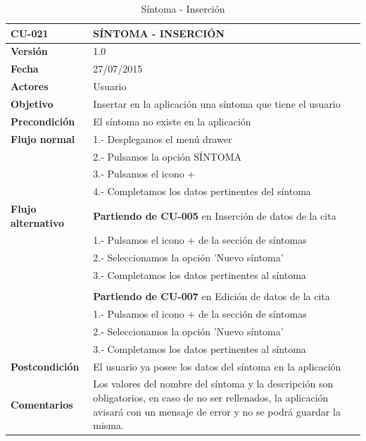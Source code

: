 \documentclass[../pfc.tex]{subfiles}
\begin{document}
	\begin{table}[H]
		\centering
		\begin{tabular}[t]{|p{3cm}|p{9.5cm}|}
			\hline \textbf{CU-021} & \textbf{SÍNTOMA - INSERCIÓN} \\*
			\hline\hline \textbf{Versión} & 1.0 \\*
			\hline\hline \textbf{Fecha} & 27/07/2015 \\*
			\hline\textbf{Actores} 	& Usuario\\*
			\hline \textbf{Objetivo} & Insertar en la aplicación una síntoma que tiene el usuario\\* 			
			\hline \textbf{Precondición} & El síntoma no existe en la aplicación\\* 
			\hline \textbf{Flujo normal} & 1.- Desplegamos el menú drawer \\* 
			& 2.- Pulsamos la opción SÍNTOMA\\*	
			& 3.- Pulsamos el icono +\\*	
			& 4.- Completamos los datos pertinentes del síntoma\\*	
			\hline \textbf{Flujo alternativo} & \textbf{Partiendo de CU-005} en Inserción de datos de la cita\\* 
			& 1.- Pulsamos el icono + de la sección de síntomas\\*	
			& 2.- Seleccionamos la opción 'Nuevo síntoma'\\*
			& 3.- Completamos los datos pertinentes al síntoma\\*
			& \\*
			& \textbf{Partiendo de CU-007} en Edición de datos de la cita\\* 
			& 1.- Pulsamos el icono + de la sección de síntomas\\*	
			& 2.- Seleccionamos la opción 'Nuevo síntoma'\\*
			& 3.- Completamos los datos pertinentes al síntoma\\*
			\hline \textbf{Postcondición} & El usuario ya posee los datos del síntoma en la aplicación \\* 
			\hline \textbf{Comentarios}   & Los valores del nombre del síntoma y la descripción son obligatorios, en caso de no ser rellenados, la aplicación avisará con un mensaje de error y no se podrá guardar la misma.\\*
			\hline
		\end{tabular}
		\caption{Síntoma - Inserción}
		\label{tabla:caso021}
	\end{table}
	
\end{document}

